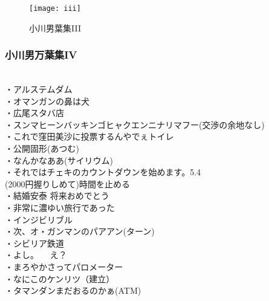 \begin{figure}[H]
\centering
\texttt{[image: iii]}
    \caption{小川男葉集III}
    \label{iii}
\end{figure}



\newpage
\subsubsection{小川男万葉集IV}
　\\
・アルステムダム\\
・オマンガンの鼻は犬\\
・広尾スタバ店\\
・スンマヒーンバッキンゴヒャクエンニナリマフー(交渉の余地なし)\\
・これで窪田美沙に投票するんやでぇトイレ\\
・公開固形(あつむ)\\
・なんかなああ(サイリウム)\\
・それではチェキのカウントダウンを始めます。5.4\\
    (2000円握りしめて)時間を止める\\
・結婚安泰 将来おめでとう\\
・非常に濃ゆい旅行であった\\
・インジビリブル\\
・次、オ・ガンマンのパアアン(ターン)\\
・シビリア鉄道\\
・よし。   \ \      え？\\
・まろやかさってパロメーター\\
・なにこのケンリツ（建立）\\
・タマンダンまだおるのかぁ(ATM)\\

\newpage
